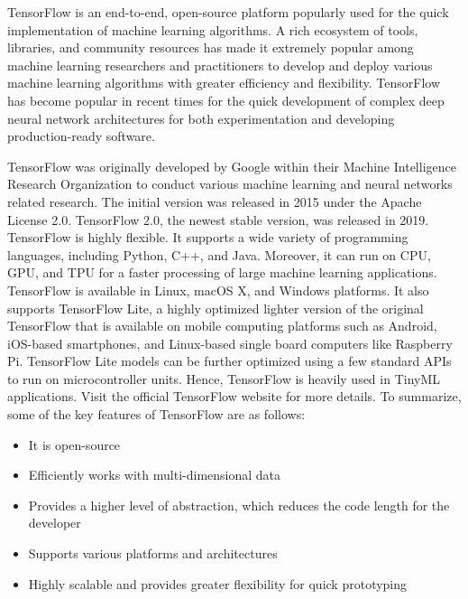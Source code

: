 TensorFlow is an end-to-end, open-source platform popularly used for the quick implementation of machine learning algorithms. A rich ecosystem of tools, libraries, and community resources has made it extremely popular among machine learning researchers and practitioners to develop and deploy various machine learning algorithms with greater efficiency and flexibility. TensorFlow has become popular in recent times for the quick development of complex deep neural network architectures for both experimentation and developing production-ready software.\cite{Khandelwal:2021}

TensorFlow was originally developed by Google within their Machine Intelligence Research Organization to conduct various machine learning and neural networks related research. The initial version was released in 2015 under the Apache License 2.0. TensorFlow 2.0, the newest stable version, was released in 2019. TensorFlow is highly flexible. It supports a wide variety of programming languages, including Python, C++, and Java. Moreover, it can run on CPU, GPU, and TPU for a faster processing of large machine learning applications. TensorFlow is available in Linux, macOS X, and Windows platforms. It also supports TensorFlow Lite, a highly optimized lighter version of the original TensorFlow that is available on mobile computing platforms such as Android, iOS-based smartphones, and Linux-based single board computers like Raspberry Pi. TensorFlow Lite models can be further optimized using a few standard APIs to run on microcontroller units. Hence, TensorFlow is heavily used in TinyML applications. Visit the official TensorFlow website for more details. To summarize, some of the key features of TensorFlow are as follows:

\begin{itemize}
	
	\item It is open-source 
	
	\item Efficiently works with multi-dimensional data
	
	\item Provides a higher level of abstraction, which reduces the code length for the developer 
	
	\item Supports various platforms and architectures
	
	\item Highly scalable and provides greater flexibility for quick prototyping 
	
\end{itemize}

